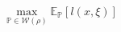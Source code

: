 \documentclass[preview]{standalone}
\begin{document}
\begin{align*}
\max_{\mathbb{P} \in \mathcal{W}(\rho)} \mathbb{E}_{\mathbb{P}}\left[l(x, \xi)\right]
\end{align*}
\end{document}

